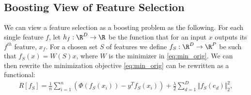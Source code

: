 \subsection{Boosting View of Feature Selection}
We can view a feature selection as a boosting problem as the following. 
For each single feature $f$, let $h_f : \R^D \rightarrow \R$ be the function that for 
an input $x$ outputs its $f^{th}$ feature, $x_f$. 
For a chosen set $S$ of features we 
define $f_S: \R^D \rightarrow \R^P$ be such that 
$f_S(x) = W(S)x$, where $W$ is the minimizer in \ref{eq:min_orig}. 
We can then rewrite the minimization objective \ref{eq:min_orig}
can be rewritten as a functional:
\begin{align}
  R[f_S] = \frac{1}{n} \sum _{i=1}^n (\Phi(f_S(x_i)) - y^Tf_S(x_i)) 
    + \frac{\lambda}{2} \sum _{d = 1}^D \Vert f_S(e_d) \Vert _2^2,
  \label{min_func}

\end{align}
